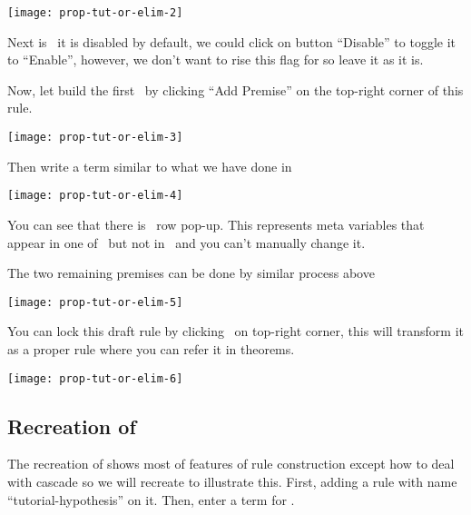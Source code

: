 \documentclass[master.tex]{subfiles}
\begin{document}
\begin{center}
  \texttt{[image: prop-tut-or-elim-2]}
\end{center}

Next is \kAllowReduction\, it is disabled by default, we could click on button
``Disable'' to toggle it to ``Enable'', however, we don't want to rise this flag
for  so leave it as it is.

Now, let build the first \kPremise\ by clicking ``Add Premise'' on the top-right
corner of this rule.

\begin{center}
  \texttt{[image: prop-tut-or-elim-3]}
\end{center}

Then write a term similar to what we have done in \kConclusion\

\begin{center}
  \texttt{[image: prop-tut-or-elim-4]}
\end{center}

You can see that there is \kParameter\ row pop-up. This represents meta
variables that appear in one of \kPremise\ but not in \kConclusion\ and you can't
manually change it.

The two remaining premises can be done by similar process above

\begin{center}
  \texttt{[image: prop-tut-or-elim-5]}
\end{center}

You can lock this draft rule by clicking \lockButton\ on top-right corner,
this will transform it as a proper rule where you can refer it in theorems.

\begin{center}
  \texttt{[image: prop-tut-or-elim-6]}
\end{center}

\newpage

\subsection{Recreation of }

The recreation of  shows most of features of rule construction
except how to deal with cascade so we will recreate  to
illustrate this. First, adding a rule with name ``tutorial-hypothesis'' on it.
Then, enter a term for \kConclusion.
\end{document}
